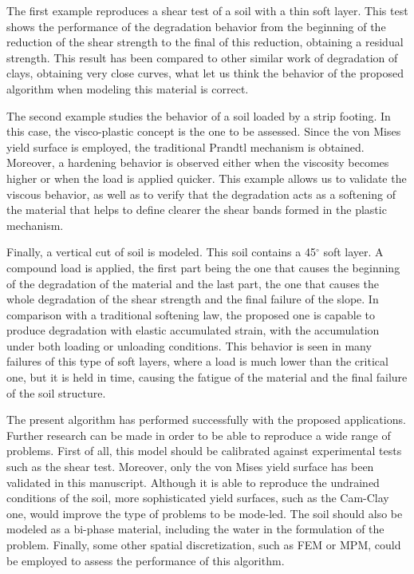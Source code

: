 \documentclass[applsci,journal,article,submit,moreauthors,pdftex]{Definitions/mdpi}
\begin{document}
The first example reproduces a shear test of a soil with a thin soft layer. This test shows the performance of the degradation behavior from the beginning of the reduction of the shear strength to the final of this reduction, obtaining a residual strength. This result has been compared to other similar work of degradation of clays, obtaining very close curves,  what let us think the behavior of the proposed algorithm when modeling this material is correct.

The second example studies the behavior of a soil loaded by a strip footing. In this case, the visco-plastic concept is the one to be assessed. Since the von Mises yield surface is employed, the traditional Prandtl mechanism is obtained. Moreover, a hardening behavior is observed either when the viscosity becomes higher or when the load is applied quicker. This example allows us to validate the viscous behavior, as well as to verify that the degradation acts as a softening of the material that helps to define clearer the shear bands formed in the plastic mechanism.

Finally, a vertical cut of soil is modeled. This soil contains a 45$^\circ$ soft layer. A compound load is applied, the first part being the one that causes the beginning of the degradation of the material and the last part, the one that causes the whole degradation of the shear strength and the final failure of the slope. In comparison with a traditional softening law, the proposed one is capable to produce degradation with elastic accumulated strain, with the accumulation under both loading or unloading conditions. This behavior is seen in many failures of this type of soft layers, where a load is much lower than the critical one, but it is held in time, causing the fatigue of the material and the final failure of the soil structure. 

The present algorithm has performed successfully with the proposed applications. Further research can be made in order to be able to reproduce a wide range of problems. First of all, this model should be calibrated against experimental tests such as the shear test. Moreover, only the von Mises yield surface has been validated in this manuscript. Although it is able to reproduce the undrained conditions of the soil, more sophisticated yield surfaces, such as the Cam-Clay one, would improve the type of problems to be mode-led. The soil should also be modeled as a bi-phase material, including the water in the formulation of the problem. Finally, some other spatial discretization, such as FEM or MPM, could be employed to assess the performance of this algorithm.
\end{document}
